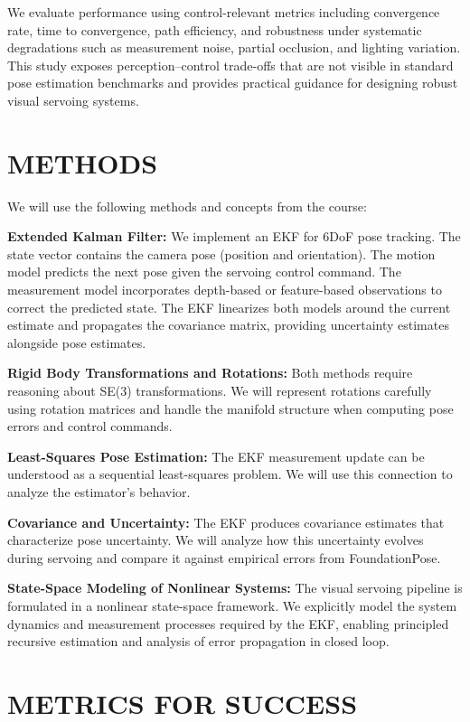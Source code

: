 \documentclass[letterpaper, 10 pt, conference]{ieeeconf}  %
\begin{document}
We evaluate performance using control-relevant metrics including convergence rate, time to convergence, path efficiency, and robustness under systematic degradations such as measurement noise, partial occlusion, and lighting variation. This study exposes perception–control trade-offs that are not visible in standard pose estimation benchmarks and provides practical guidance for designing robust visual servoing systems.

\section{METHODS}

We will use the following methods and concepts from the course:

\textbf{Extended Kalman Filter:} We implement an EKF for 6DoF pose tracking. The state vector contains the camera pose (position and orientation). The motion model predicts the next pose given the servoing control command. The measurement model incorporates depth-based or feature-based observations to correct the predicted state. The EKF linearizes both models around the current estimate and propagates the covariance matrix, providing uncertainty estimates alongside pose estimates.

\textbf{Rigid Body Transformations and Rotations:} Both methods require reasoning about SE(3) transformations. We will represent rotations carefully using rotation matrices and handle the manifold structure when computing pose errors and control commands.

\textbf{Least-Squares Pose Estimation:} The EKF measurement update can be understood as a sequential least-squares problem. We will use this connection to analyze the estimator's behavior.

\textbf{Covariance and Uncertainty:} The EKF produces covariance estimates that characterize pose uncertainty. We will analyze how this uncertainty evolves during servoing and compare it against empirical errors from FoundationPose.

\textbf{State-Space Modeling of Nonlinear Systems:} The visual servoing pipeline is formulated in a nonlinear state-space framework. We explicitly model the system dynamics and measurement processes required by the EKF, enabling principled recursive estimation and analysis of error propagation in closed loop.

\section{METRICS FOR SUCCESS}
\end{document}
